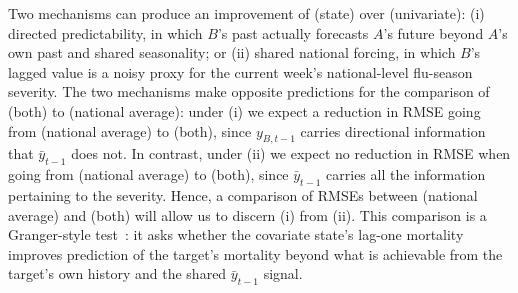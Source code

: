 Two mechanisms can produce an improvement of (state) over
(univariate): (i) directed predictability, in which $B$'s past
actually forecasts $A$'s future beyond $A$'s own past and shared
seasonality; or (ii) shared national forcing, in which $B$'s lagged
value is a noisy proxy for the current week's national-level
flu-season severity. The two mechanisms make opposite predictions for
the comparison of (both) to (national average): under (i) we expect a
reduction in RMSE going from (national average) to (both), since
$y_{B,t-1}$ carries directional information that $\bar y_{t-1}$ does
not. In contrast, under (ii) we expect no reduction in RMSE when going
from (national average) to (both), since $\bar y_{t-1}$ carries all
the information pertaining to the severity. Hence, a comparison of
RMSEs between (national average) and (both) will allow us to discern
(i) from (ii). This comparison is a Granger-style
test~\citep{granger1969}: it asks whether the covariate state's
lag-one mortality improves prediction of the target's mortality beyond
what is achievable from the target's own history and the shared $\bar
y_{t-1}$ signal.
